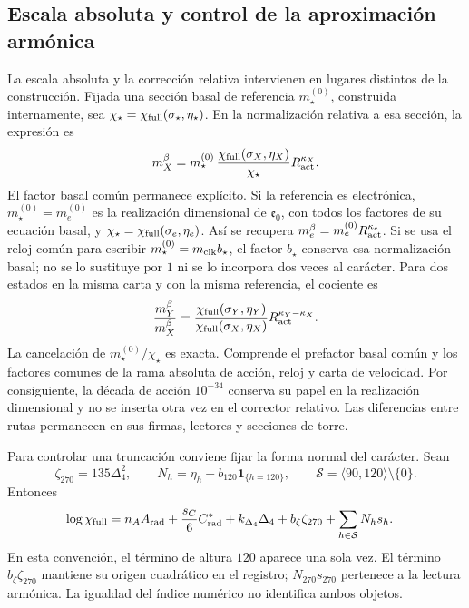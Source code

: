 \subsection{Escala absoluta y control de la aproximación armónica}
\label{vi:subsec:vi-precision-torres}

La escala absoluta y la corrección relativa intervienen en lugares
distintos de la construcción. Fijada una sección basal de referencia
\(m_\star^{(0)}\), construida internamente, sea
\(\chi_\star=\chi_{\rm full}(\sigma_\star,\eta_\star)\).
En la normalización relativa a esa sección, la expresión es
\[
 m_X^\beta=m_\star^{(0)}\,
 \frac{\chi_{\rm full}(\sigma_X,\eta_X)}{\chi_\star}
 R_{\rm act}^{\kappa_X}.
\]
El factor basal común permanece explícito. Si la referencia es electrónica,
\(m_\star^{(0)}=m_e^{(0)}\) es la realización dimensional de
\(\mathfrak e_0\), con todos los factores de su ecuación basal, y
\(\chi_\star=\chi_{\rm full}(\sigma_e,\eta_e)\). Así se recupera
\(m_e^\beta=m_e^{(0)}R_{\rm act}^{\kappa_e}\). Si se usa el reloj
común para escribir \(m_\star^{(0)}=m_{\rm clk}b_\star\), el
factor \(b_\star\) conserva esa normalización basal; no se lo sustituye
por \(1\) ni se lo incorpora dos veces al carácter. Para dos estados
en la misma carta y con la misma referencia, el cociente es
\[
 \frac{m_Y^\beta}{m_X^\beta}
 =\frac{\chi_{\rm full}(\sigma_Y,\eta_Y)}
        {\chi_{\rm full}(\sigma_X,\eta_X)}
     R_{\rm act}^{\kappa_Y-\kappa_X}.
\]
La cancelación de \(m_\star^{(0)}/\chi_\star\) es exacta. Comprende
el prefactor basal común y los factores comunes de la rama absoluta de
acción, reloj y carta de velocidad. Por
consiguiente, la década de acción \(10^{-34}\) conserva su papel en
la realización dimensional y no se inserta otra vez en el corrector
relativo. Las diferencias entre rutas permanecen en sus firmas, lectores
y secciones de torre.

Para controlar una truncación conviene fijar la forma normal del carácter.
Sean
\[
 \zeta_{270}=135\Delta_4^2,\qquad
 N_h=\eta_h+b_{120}\mathbf 1_{\{h=120\}},\qquad
 \mathcal S=\langle90,120\rangle\setminus\{0\}.
\]
Entonces
\[
\begin{split}
 \log\chi_{\rm full}
 ={}&n_AA_{\rm rad}+\frac{s_C}{6}C^*_{\rm rad}
       +k_{\Delta_4}\Delta_4+b_\zeta\zeta_{270}
       +\sum_{h\in\mathcal S}N_hs_h .
\end{split}
\]
En esta convención, el término de altura \(120\) aparece una sola vez.
El término \(b_\zeta\zeta_{270}\) mantiene su origen cuadrático en el
registro; \(N_{270}s_{270}\) pertenece a la lectura armónica. La
igualdad del índice numérico no identifica ambos objetos.

